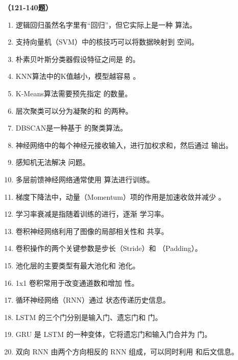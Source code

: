 \vspace{1em}
\textbf{（121-140题）}
\begin{enumerate}[resume,leftmargin=2em,itemsep=1pt]
\item 逻辑回归虽然名字里有“回归”，但它实际上是一种 \underline{\hspace{3em}} 算法。
\item 支持向量机（SVM）中的核技巧可以将数据映射到 \underline{\hspace{3em}} 空间。
\item 朴素贝叶斯分类器假设特征之间是 \underline{\hspace{3em}} 的。
\item KNN算法中的K值越小，模型越容易 \underline{\hspace{3em}}。
\item K-Means算法需要预先指定 \underline{\hspace{3em}} 的数量。
\item 层次聚类可以分为凝聚的和 \underline{\hspace{3em}} 的两种。
\item DBSCAN是一种基于 \underline{\hspace{3em}} 的聚类算法。
\item 神经网络中的每个神经元接收输入，进行加权求和，然后通过 \underline{\hspace{3em}} 输出。
\item 感知机无法解决 \underline{\hspace{3em}} 问题。
\item 多层前馈神经网络通常使用 \underline{\hspace{3em}} 算法进行训练。
\item 梯度下降法中，动量（Momentum）项的作用是加速收敛并减少 \underline{\hspace{3em}}。
\item 学习率衰减是指随着训练的进行，逐渐 \underline{\hspace{3em}} 学习率。
\item 卷积神经网络利用了图像的局部相关性和 \underline{\hspace{3em}} 共享。
\item 卷积操作的两个关键参数是步长（Stride）和 \underline{\hspace{3em}}（Padding）。
\item 池化层的主要类型有最大池化和 \underline{\hspace{3em}} 池化。
\item 1x1 卷积常用于改变通道数和增加 \underline{\hspace{3em}} 性。
\item 循环神经网络（RNN）通过 \underline{\hspace{3em}} 状态传递历史信息。
\item LSTM 的三个门分别是输入门、遗忘门和 \underline{\hspace{3em}} 门。
\item GRU 是 LSTM 的一种变体，它将遗忘门和输入门合并为 \underline{\hspace{3em}} 门。
\item 双向 RNN 由两个方向相反的 RNN 组成，可以同时利用 \underline{\hspace{3em}} 和后文信息。
\end{enumerate}

